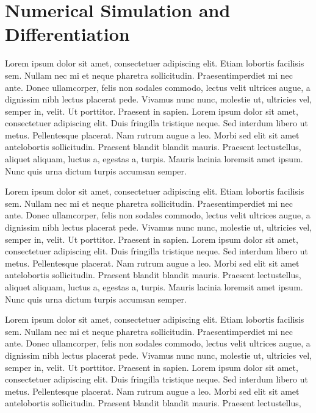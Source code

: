 \section{Numerical Simulation and Differentiation}

Lorem ipsum dolor sit amet, consectetuer adipiscing elit. Etiam lobortis facilisis sem. Nullam nec mi et neque pharetra sollicitudin. Praesentimperdiet mi nec ante. Donec ullamcorper, felis non sodales commodo, lectus velit ultrices augue, a dignissim nibh lectus placerat pede. Vivamus nunc nunc, molestie ut, ultricies vel, semper in, velit. Ut porttitor. Praesent in sapien. Lorem ipsum dolor sit amet, consectetuer adipiscing elit. Duis fringilla tristique neque. Sed interdum libero ut metus. Pellentesque placerat. Nam rutrum augue a leo. Morbi sed elit sit amet antelobortis sollicitudin. Praesent blandit blandit mauris. Praesent lectustellus, aliquet aliquam, luctus a, egestas a, turpis. Mauris lacinia loremsit amet ipsum. Nunc quis urna dictum turpis accumsan semper.

Lorem ipsum dolor sit amet, consectetuer adipiscing elit. Etiam lobortis facilisis sem. Nullam nec mi et neque pharetra sollicitudin. Praesentimperdiet mi nec ante. Donec ullamcorper, felis non sodales commodo, lectus velit ultrices augue, a dignissim nibh lectus placerat pede. Vivamus nunc nunc, molestie ut, ultricies vel, semper in, velit. Ut porttitor. Praesent in sapien. Lorem ipsum dolor sit amet, consectetuer adipiscing elit. Duis fringilla tristique neque. Sed interdum libero ut metus. Pellentesque placerat. Nam rutrum augue a leo. Morbi sed elit sit amet antelobortis sollicitudin. Praesent blandit blandit mauris. Praesent lectustellus, aliquet aliquam, luctus a, egestas a, turpis. Mauris lacinia loremsit amet ipsum. Nunc quis urna dictum turpis accumsan semper.

Lorem ipsum dolor sit amet, consectetuer adipiscing elit. Etiam lobortis facilisis sem. Nullam nec mi et neque pharetra sollicitudin. Praesentimperdiet mi nec ante. Donec ullamcorper, felis non sodales commodo, lectus velit ultrices augue, a dignissim nibh lectus placerat pede. Vivamus nunc nunc, molestie ut, ultricies vel, semper in, velit. Ut porttitor. Praesent in sapien. Lorem ipsum dolor sit amet, consectetuer adipiscing elit. Duis fringilla tristique neque. Sed interdum libero ut metus. Pellentesque placerat. Nam rutrum augue a leo. Morbi sed elit sit amet antelobortis sollicitudin. Praesent blandit blandit mauris. Praesent lectustellus, aliquet aliquam, luctus a, egestas a, turpis. Mauris lacinia loremsit amet ipsum. Nunc quis urna dictum turpis accumsan semper.

